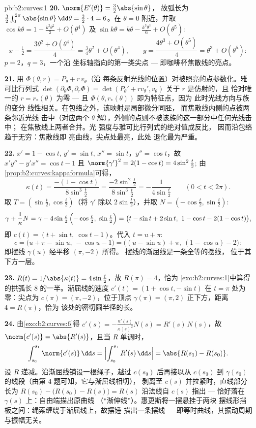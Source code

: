\begin{solution}{pb:b2:curves:1}
\textbf{20.} $\norm{E'(\theta)} = \tfrac32\abs{\sin\theta}$，
故弧长为 $\tfrac32\int_0^{2\pi}\abs{\sin\theta}\,
\dd\theta = \tfrac32\cdot4 = 6$。在 $\theta = 0$ 附近，并取
$\cos k\theta = 1 - \tfrac{k^2\theta^2}2 + O(\theta^4)$ 及
$\sin k\theta = k\theta - \tfrac{k^3\theta^3}6 +
O(\theta^5)$:
\[
x - \tfrac12 = \frac{3\theta^2 + O(\theta^4)}{4}
= \tfrac34\theta^2 + O(\theta^4),
\qquad
y = \frac{4\theta^3 + O(\theta^5)}{4}
= \theta^3 + O(\theta^5) :
\]
$p = 2$，$q = 3$，一个沿
坐标轴指向的第一类尖点 --- 即咖啡杯焦散线的亮点。

\textbf{21.} 用
$\Phi(\theta, r) = P_\theta + r\,v_\theta$（沿
每条反射光线的位置）对被照亮的点参数化。雅可比行列式
$\det(\partial_\theta\Phi, \partial_r\Phi) =
\det(P_\theta' + rv_\theta', v_\theta)$ 关于 $r$ 是仿射的，且
恰对唯一的 $r = r_*(\theta)$ 为零 --- 且
$\Phi(\theta, r_*(\theta))$ 即为特征点，因为
此时光线方向与族的变分
线性相关。在包络之外，该映射是局部微分同胚，
而焦散线内侧的点被两条邻近光线
击中（对应两个 $\theta$ 解），外侧的点则不被该族的这一部分中任何光线击中；
在焦散线上两者合并。光
强度与雅可比行列式的绝对值成反比，
因而沿包络趋于无穷：焦散线即
亮曲线，尖点处最亮，此处
退化最为严重。

\textbf{22.} $x' = 1 - \cos t$, $y' = \sin t$, $x'' = \sin
t$，$y'' = \cos t$，故 $x'y'' - y'x'' = \cos t - 1$ 且
$\norm{\gamma'}^2 = 2(1 - \cos t) = 4\sin^2\tfrac t2$;
由\cref{prop:b2:curves:kappaformula}可得，
\[
\kappa(t) = \frac{-(1 - \cos t)}{8\sin^3\tfrac t2}
= \frac{-2\sin^2\tfrac t2}{8\sin^3\tfrac t2}
= -\frac1{4\sin\tfrac t2}
\qquad (0 < t < 2\pi).
\]
取 $T = (\sin\tfrac t2, \cos\tfrac t2)$（将 $\gamma'$
除以 $2\sin\tfrac t2$），并取 $N = (-\cos\tfrac t2, \sin\tfrac
t2)$:
\[
\gamma + \frac1\kappa N
= \gamma - 4\sin\tfrac t2\,\Bigl(-\cos\tfrac t2,\
\sin\tfrac t2\Bigr)
= \bigl(t - \sin t + 2\sin t,\ 1 - \cos t - 2(1 - \cos
t)\bigr),
\]
即 $c(t) = (t + \sin t,\ \cos t - 1)$。代入 $t = u
+ \pi$:
\[
c = \bigl(u + \pi - \sin u,\ -\cos u - 1\bigr)
= \bigl((u - \sin u) + \pi,\ (1 - \cos u) - 2\bigr) :
\]
即摆线 $\gamma(u)$ 经平移 $(\pi, -2)$ 所得。
摆线的渐屈线是一条全等的摆线，
位于其下方一层。

\textbf{23.} $R(t) = 1/\abs{\kappa(t)} = 4\sin\tfrac t2$，故
$R(\pi) = 4$，恰为
\cref{exo:b2:curves:1}中算得的拱弧长 $8$ 的一半。渐屈线的速度 $c'(t) = (1 +
\cos t, -\sin t)$ 在 $t = \pi$ 处为零：尖点为 $c(\pi)
= (\pi, -2)$，位于顶点 $\gamma(\pi) = (\pi,
2)$ 正下方，距离 $4 = R(\pi)$，恰为
该处的密切圆半径的长。

\textbf{24.} 由\cref{exo:b2:curves:6}得 $c'(s) =
-\frac{\kappa'(s)}{\kappa(s)^2}N(s) = R'(s)\,N(s)$，故
$\norm{c'(s)} = \abs{R'(s)}$，且当 $R$ 单调时，
\[
\int_{s_0}^{s_1}\norm{c'(s)}\,\dd s =
\Bigl|\int_{s_0}^{s_1}R'(s)\,\dd s\Bigr| = \abs{R(s_1) -
R(s_0)} .
\]
设 $R$ 递减。沿渐屈线铺设一根绳子，越过
$c(s_0)$ 后再接以从 $c(s_0)$ 到
$\gamma(s_0)$ 的线段（由第 4 题可知，它与渐屈线相切），
剥离至 $c(s)$ 并拉紧时，直线部分
长为 $R(s_0) - \bigl(R(s_0) - R(s)\bigr) = R(s)$
沿法线自 $c(s)$ 指出 --- 恰好落在
$\gamma(s)$ 上：自由端描出原曲线
（“渐伸线”）。惠更斯将一摆悬挂于两块
摆线形挡板之间：绳索缠绕于渐屈线上，故摆锤
描出一条摆线 --- 即等时曲线，其振动周期
与振幅无关。


\end{solution}
